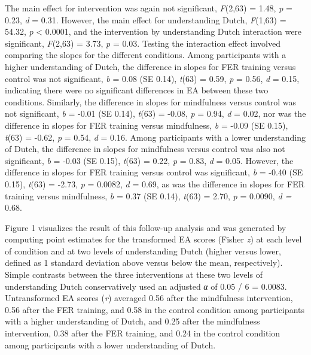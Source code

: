 \documentclass[authordate, empirical, issue]{jote-new-article}
\begin{document}
The main effect for intervention was again not significant, \emph{F}(2,63) = 1.48, \emph{p} = 0.23, \emph{d} = 0.31. However, the main effect for understanding Dutch, \emph{F}(1,63) = 54.32, \emph{p} < 0.0001, and the intervention by understanding Dutch interaction were significant, \emph{F}(2,63) = 3.73, \emph{p} = 0.03. Testing the interaction effect involved comparing the slopes for the different conditions. Among participants with a higher understanding of Dutch, the difference in slopes for FER training versus control was not significant, \emph{b} = 0.08 (SE 0.14), \emph{t}(63) = 0.59, \emph{p} = 0.56, \emph{d} = 0.15, indicating there were no significant differences in EA between these two conditions. Similarly, the difference in slopes for mindfulness versus control was not significant, \emph{b} = -0.01 (SE 0.14), \emph{t}(63) = -0.08, \emph{p} = 0.94, \emph{d} = 0.02, nor was the difference in slopes for FER training versus mindfulness, \emph{b} = -0.09 (SE 0.15), \emph{t}(63) = -0.62, \emph{p} = 0.54, \emph{d} = 0.16. Among participants with a lower understanding of Dutch, the difference in slopes for mindfulness versus control was also not significant, \emph{b} = -0.03 (SE 0.15), \emph{t}(63) = 0.22, \emph{p} = 0.83, \emph{d} = 0.05. However, the difference in slopes for FER training versus control was significant, \emph{b} = -0.40 (SE 0.15), \emph{t}(63) = -2.73, \emph{p} = 0.0082, \emph{d} = 0.69, as was the difference in slopes for FER training versus mindfulness, \emph{b} = 0.37 (SE 0.14), \emph{t}(63) = 2.70, \emph{p} = 0.0090, \emph{d = }0.68.



Figure 1 visualizes the result of this follow-up analysis and was generated by computing point estimates for the transformed EA scores (Fisher \emph{z}) at each level of condition and at two levels of understanding Dutch (higher versus lower, defined as 1 standard deviation above versus below the mean, respectively). Simple contrasts between the three interventions at these two levels of understanding Dutch conservatively used an adjusted \emph{α} of 0.05 / 6 = 0.0083. Untransformed EA scores (\emph{r})\emph{ }averaged 0.56 after the mindfulness intervention, 0.56 after the FER training, and 0.58 in the control condition among participants with a higher understanding of Dutch, and 0.25 after the mindfulness intervention, 0.38 after the FER training, and 0.24 in the control condition among participants with a lower understanding of Dutch.
\end{document}
